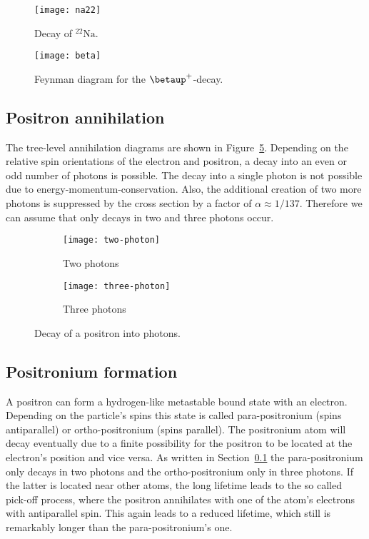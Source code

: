 \documentclass[11pt, english, fleqn, DIV=15, headinclude, BCOR=2cm]{scrreprt}
\begin{document}
\begin{figure}
    \centering
    \texttt{[image: na22]}
    \caption{%
        Decay of $\mathrm{^{22}Na}$.
    }
    \label{fig:na22}
\end{figure}

\begin{figure}
    \centering
    \texttt{[image: beta]}
    \caption{%
        Feynman diagram for the $\betaup^+$-decay.
    }
    \label{fig:beta}
\end{figure}

\subsection{Positron annihilation}
\label{ssec:pos_ann}

The tree-level annihilation diagrams are shown in
Figure~\ref{fig:annihilation}. Depending on the relative spin orientations of
the electron and positron, a decay into an even or odd number of photons is
possible. The decay into a single photon is not possible due to
energy-momentum-conservation. Also, the additional creation of two more
photons is suppressed by the cross section by a factor of $\alpha \approx
1/137$. Therefore we can assume that only decays in two and three photons
occur.

\begin{figure}
    \centering
    \begin{subfigure}[c]{0.48\linewidth}
        \centering
        \texttt{[image: two-photon]}
        \caption{%
            Two photons
        }
        \label{fig:/1}
    \end{subfigure}
    \hfill
    \begin{subfigure}[c]{0.48\linewidth}
        \centering
        \texttt{[image: three-photon]}
        \caption{%
            Three photons
        }
        \label{fig:/2}
    \end{subfigure}
    \caption{%
        Decay of a positron into photons.
    }
    \label{fig:annihilation}
\end{figure}

\subsection{Positronium formation}

A positron can form a hydrogen-like metastable bound state with an electron.
Depending on the particle's spins this state is called para-positronium (spins
antiparallel) or ortho-positronium (spins parallel). The positronium atom will
decay eventually due to a finite possibility for the positron to be located at
the electron's position and vice versa. As written in
Section~\ref{ssec:pos_ann} the para-positronium only decays in two photons and
the ortho-positronium only in three photons. If the latter is located near
other atoms, the long lifetime leads to the so called pick-off process, where
the positron annihilates with one of the atom's electrons with antiparallel
spin. This again leads to a reduced lifetime, which still is remarkably longer
than the para-positronium's one.
\end{document}
